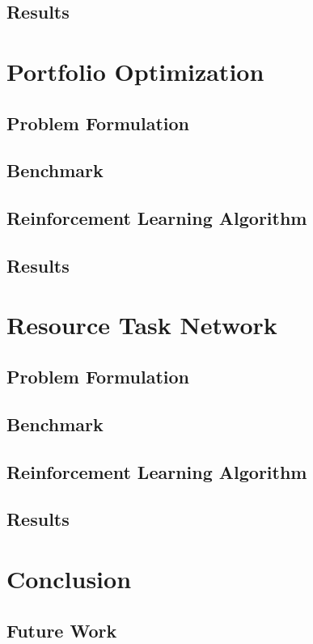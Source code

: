 \documentclass[12pt]{article}
\begin{document}
\subsection{Results}

\section{Portfolio Optimization}

\subsection{Problem Formulation}

\subsection{Benchmark}

\subsection{Reinforcement Learning Algorithm}

\subsection{Results}

\section{Resource Task Network}

\subsection{Problem Formulation}

\subsection{Benchmark}

\subsection{Reinforcement Learning Algorithm}

\subsection{Results}

\section{Conclusion}

\subsection{Future Work}

\newpage


\end{document}
